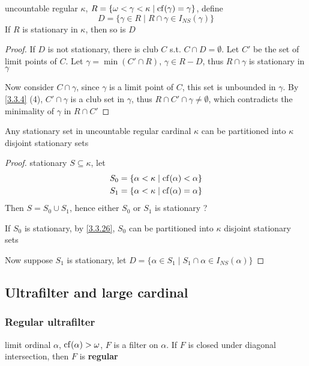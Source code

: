 \documentclass[11pt]{article}
\begin{document}
\begin{lemma}[]
uncountable regular \(\kappa\), \(R=\{\omega<\gamma<\kappa\mid\operatorname{cf}(\gamma)=\gamma\}\), define
\begin{equation*}
D=\{\gamma\in R\mid R\cap\gamma\in I_{NS}(\gamma)\}
\end{equation*}
If \(R\) is stationary in \(\kappa\), then so is \(D\)
\end{lemma}

\begin{proof}
If \(D\) is not stationary, there is club \(C\) s.t. \(C\cap D=\emptyset\). Let \(C'\) be the set of limit
points of \(C\). Let \(\gamma=\min(C'\cap R)\), \(\gamma\in R-D\), thus \(R\cap\gamma\) is stationary in \(\gamma\)

Now consider \(C\cap\gamma\), since \(\gamma\) is a limit point of \(C\), this set is unbounded in \(\gamma\). By
\ref{3.3.4} (4), \(C'\cap\gamma\) is a club set in \(\gamma\), thus \(R\cap C'\cap\gamma\neq\emptyset\), which contradicts the minimality
of \(\gamma\) in \(R\cap C'\)
\end{proof}

\begin{theorem}[Soloway]
Any stationary set in uncountable regular cardinal \(\kappa\) can be partitioned into \(\kappa\) disjoint
stationary sets
\end{theorem}

\begin{proof}
stationary \(S\subseteq\kappa\), let
\begin{align*}
&S_0=\{\alpha<\kappa\mid\operatorname{cf}(\alpha)<\alpha\}\\
&S_1=\{\alpha<\kappa\mid\operatorname{cf}(\alpha)=\alpha\}
\end{align*}
Then \(S=S_0\cup S_1\), hence either \(S_0\) or \(S_1\) is stationary ?

If \(S_0\) is stationary, by \ref{3.3.26}, \(S_0\) can be partitioned into \(\kappa\) disjoint stationary
sets

Now suppose \(S_1\) is stationary, let \(D=\{\alpha\in S_1\mid S_1\cap\alpha\in I_{NS}(\alpha)\}\)
\end{proof}






\subsection{Ultrafilter and large cardinal}
\label{sec:org6f5bc34}
\subsubsection{Regular ultrafilter}
\label{sec:org7001f66}
\begin{definition}[]
limit ordinal \(\alpha\), \(\operatorname{cf}(\alpha)>\omega\), \(F\) is a filter on \(\alpha\). If \(F\) is closed under diagonal
intersection, then \(F\) is \textbf{regular}
\end{definition}
\end{document}
